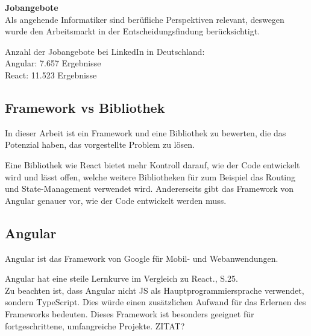 \textbf{Jobangebote}\\
Als angehende Informatiker sind berüfliche Perspektiven relevant, deswegen wurde den Arbeitsmarkt in der Entscheidungsfindung berücksichtigt.

\begin{flushleft}
Anzahl der Jobangebote bei LinkedIn in Deutschland:
\\
Angular: 7.657 Ergebnisse{\cite{LI1}}
\\
React: 11.523 Ergebnisse{\cite{LI2}}
\end{flushleft}
\subsection{Framework vs Bibliothek}
In dieser Arbeit ist ein Framework und eine Bibliothek zu bewerten, die das Potenzial haben, das vorgestellte Problem zu lösen.

Eine Bibliothek wie React bietet mehr Kontroll darauf, wie der Code entwickelt wird und lässt offen, welche weitere Bibliotheken für zum Beispiel das Routing und State-Management verwendet wird.
Andererseits gibt das Framework von Angular genauer vor, wie der Code entwickelt werden muss.  

\subsection{Angular}
Angular ist das Framework von Google für Mobil- und Webanwendungen.

Angular hat eine steile Lernkurve im Vergleich zu React.{\cite{E01}}, S.25.
\\


Zu beachten ist, dass Angular nicht JS als Hauptprogrammiersprache verwendet, sondern TypeScript. Dies würde einen zusätzlichen Aufwand für das Erlernen des Frameworks bedeuten. Dieses Framework ist besonders geeignet für fortgeschrittene, umfangreiche Projekte.
ZITAT?

